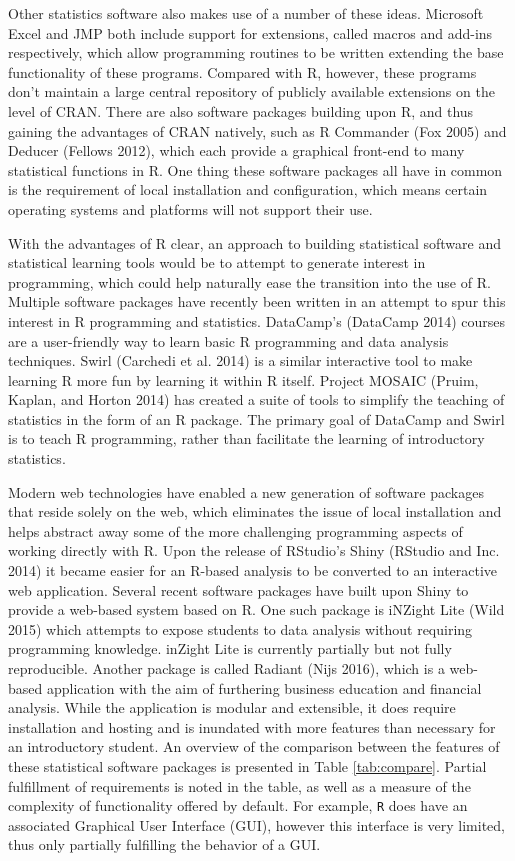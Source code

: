 \documentclass[12pt,]{article}
\begin{document}
Other statistics software also makes use of a number of these ideas.
Microsoft Excel and JMP both include support for extensions, called
macros and add-ins respectively, which allow programming routines to be
written extending the base functionality of these programs. Compared
with R, however, these programs don't maintain a large central
repository of publicly available extensions on the level of CRAN. There
are also software packages building upon R, and thus gaining the
advantages of CRAN natively, such as R Commander (Fox 2005) and Deducer
(Fellows 2012), which each provide a graphical front-end to many
statistical functions in R. One thing these software packages all have
in common is the requirement of local installation and configuration,
which means certain operating systems and platforms will not support
their use.

With the advantages of R clear, an approach to building statistical
software and statistical learning tools would be to attempt to generate
interest in programming, which could help naturally ease the transition
into the use of R. Multiple software packages have recently been written
in an attempt to spur this interest in R programming and statistics.
DataCamp's (DataCamp 2014) courses are a user-friendly way to learn
basic R programming and data analysis techniques. Swirl (Carchedi et al.
2014) is a similar interactive tool to make learning R more fun by
learning it within R itself. Project MOSAIC (Pruim, Kaplan, and Horton
2014) has created a suite of tools to simplify the teaching of
statistics in the form of an R package. The primary goal of DataCamp and
Swirl is to teach R programming, rather than facilitate the learning of
introductory statistics.

Modern web technologies have enabled a new generation of software
packages that reside solely on the web, which eliminates the issue of
local installation and helps abstract away some of the more challenging
programming aspects of working directly with R. Upon the release of
RStudio's Shiny (RStudio and Inc. 2014) it became easier for an R-based
analysis to be converted to an interactive web application. Several
recent software packages have built upon Shiny to provide a web-based
system based on R. One such package is iNZight Lite (Wild 2015) which
attempts to expose students to data analysis without requiring
programming knowledge. inZight Lite is currently partially but not fully
reproducible. Another package is called Radiant (Nijs 2016), which is a
web-based application with the aim of furthering business education and
financial analysis. While the application is modular and extensible, it
does require installation and hosting and is inundated with more
features than necessary for an introductory student. An overview of the
comparison between the features of these statistical software packages
is presented in Table \ref{tab:compare}. Partial fulfillment of
requirements is noted in the table, as well as a measure of the
complexity of functionality offered by default. For example, \texttt{R}
does have an associated Graphical User Interface (GUI), however this
interface is very limited, thus only partially fulfilling the behavior
of a GUI.
\end{document}
